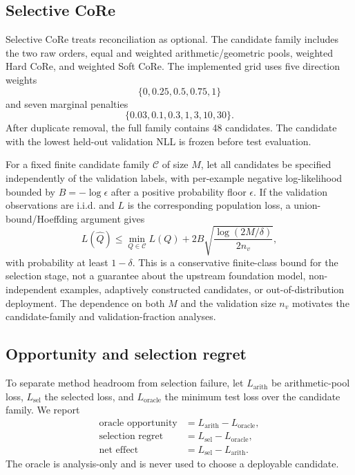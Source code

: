 \documentclass[a4paper,fleqn]{cas-sc}
\newcommand{\Cset}{\mathcal{C}}
\begin{document}
\subsection{Selective CoRe}
Selective CoRe treats reconciliation as optional. The candidate family includes the two raw orders, equal and weighted arithmetic/geometric pools, weighted Hard CoRe, and weighted Soft CoRe. The implemented grid uses five direction weights
\begin{equation}
\{0,0.25,0.5,0.75,1\}
\end{equation}
and seven marginal penalties
\begin{equation}
\{0.03,0.1,0.3,1,3,10,30\}.
\end{equation}
After duplicate removal, the full family contains 48 candidates. The candidate with the lowest held-out validation NLL is frozen before test evaluation.

For a fixed finite candidate family $\Cset$ of size $M$, let all candidates be specified independently of the validation labels, with per-example negative log-likelihood bounded by $B=-\log\epsilon$ after a positive probability floor $\epsilon$. If the validation observations are i.i.d. and $L$ is the corresponding population loss, a union-bound/Hoeffding argument gives
\begin{equation}
L(\hat Q)\le\min_{Q\in\Cset}L(Q)+2B\sqrt{\frac{\log(2M/\delta)}{2n_v}},
\end{equation}
with probability at least $1-\delta$. This is a conservative finite-class bound for the selection stage, not a guarantee about the upstream foundation model, non-independent examples, adaptively constructed candidates, or out-of-distribution deployment. The dependence on both $M$ and the validation size $n_v$ motivates the candidate-family and validation-fraction analyses.

\subsection{Opportunity and selection regret}
To separate method headroom from selection failure, let $L_{\mathrm{arith}}$ be arithmetic-pool loss, $L_{\mathrm{sel}}$ the selected loss, and $L_{\mathrm{oracle}}$ the minimum test loss over the candidate family. We report
\begin{align}
\text{oracle opportunity} &= L_{\mathrm{arith}}-L_{\mathrm{oracle}},\\
\text{selection regret} &= L_{\mathrm{sel}}-L_{\mathrm{oracle}},\\
\text{net effect} &= L_{\mathrm{sel}}-L_{\mathrm{arith}}.
\end{align}
The oracle is analysis-only and is never used to choose a deployable candidate.
\end{document}
